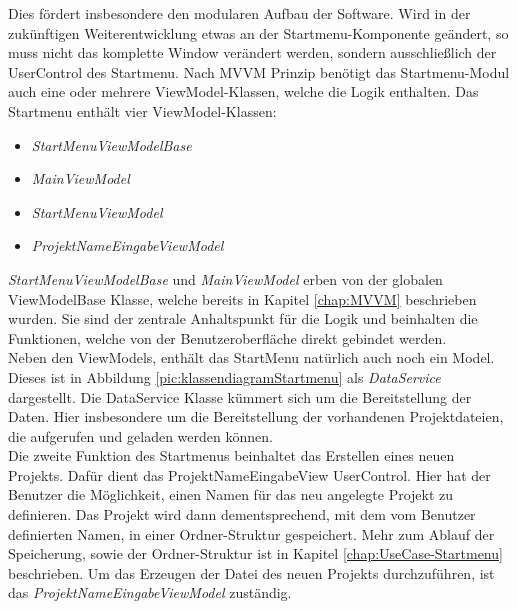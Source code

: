 Dies fördert insbesondere den modularen Aufbau der Software. Wird in der zukünftigen Weiterentwicklung etwas an der Startmenu-Komponente 
geändert, so muss nicht das komplette Window verändert werden, sondern ausschließlich der UserControl des Startmenu. Nach MVVM Prinzip 
benötigt das Startmenu-Modul auch eine oder mehrere ViewModel-Klassen, welche die Logik enthalten. Das Startmenu enthält vier 
ViewModel-Klassen:
\begin{itemize}
    \item  \textit{StartMenuViewModelBase}
    \item  \textit{MainViewModel}
    \item \textit{StartMenuViewModel}
    \item \textit{ProjektNameEingabeViewModel}
\end{itemize}  
\textit{StartMenuViewModelBase} und \textit{MainViewModel} erben von der globalen ViewModelBase Klasse, welche bereits in Kapitel 
\ref{chap:MVVM} beschrieben wurden. Sie sind der zentrale Anhaltspunkt für die Logik und beinhalten die Funktionen, welche von der 
Benutzeroberfläche direkt gebindet werden. 
\\Neben den ViewModels, enthält das StartMenu natürlich auch noch ein Model. Dieses ist in Abbildung \ref{pic:klassendiagramStartmenu} 
als \textit{DataService} dargestellt. Die DataService Klasse kümmert sich um die Bereitstellung der Daten. Hier insbesondere um die 
Bereitstellung der vorhandenen Projektdateien, die aufgerufen und geladen werden können.
\\Die zweite Funktion des Startmenus beinhaltet das Erstellen eines neuen Projekts. Dafür dient das ProjektNameEingabeView UserControl. 
Hier hat der Benutzer die Möglichkeit, einen Namen für das neu angelegte Projekt zu definieren. Das Projekt wird dann dementsprechend, mit 
dem vom Benutzer definierten Namen, in einer Ordner-Struktur gespeichert. Mehr zum Ablauf der Speicherung, sowie der Ordner-Struktur ist in 
Kapitel \ref{chap:UseCase-Startmenu} beschrieben. Um das Erzeugen der Datei des neuen Projekts durchzuführen, ist das 
\textit{ProjektNameEingabeViewModel} zuständig. 
